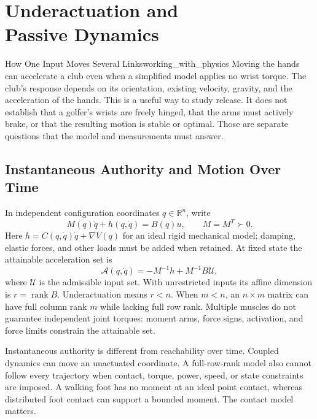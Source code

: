 \chapter[Underactuation and Passive Dynamics]{Underactuation and\\Passive Dynamics}
\label{ch:underactuation}

\begin{laymansbox}{How One Input Moves Several Links}{working_with_physics}
Moving the hands can accelerate a club even when a simplified model applies
no wrist torque. The club's response depends on its orientation, existing
velocity, gravity, and the acceleration of the hands. This is a useful way to
study release. It does not establish that a golfer's wrists are freely hinged,
that the arms must actively brake, or that the resulting motion is stable or
optimal. Those are separate questions that the model and measurements must answer.
\end{laymansbox}

\section{Instantaneous Authority and Motion Over Time}

In independent configuration coordinates $q\in\mathbb R^n$, write
\begin{equation}
M(q)\ddot q+h(q,\dot q)=B(q)u,\qquad M=M^T\succ0.
\end{equation}
Here $h=C(q,\dot q)\dot q+\nabla V(q)$ for an ideal rigid mechanical model;
damping, elastic forces, and other loads must be added when retained.
At fixed state the attainable acceleration set is
\begin{equation}
\mathcal A(q,\dot q)=-M^{-1}h+M^{-1}B\mathcal U,
\end{equation}
where $\mathcal U$ is the admissible input set. With unrestricted inputs its
affine dimension is $r=\operatorname{rank}B$. Underactuation means $r<n$.
When $m<n$, an $n\times m$ matrix can have full column rank $m$ while lacking
full row rank. Multiple muscles do not guarantee independent joint torques:
moment arms, force signs, activation, and force limits constrain the attainable set.

Instantaneous authority is different from reachability over time. Coupled
dynamics can move an unactuated coordinate. A full-row-rank model also cannot
follow every trajectory when contact, torque, power, speed, or state constraints
are imposed. A walking foot has no moment at an ideal point contact, whereas
distributed foot contact can support a bounded moment. The contact model matters.

